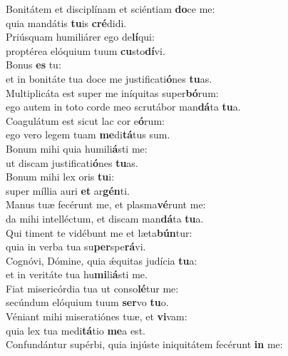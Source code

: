 \evenverse Bonitátem et disciplínam et sciéntiam \textbf{do}ce me:~\*\\
\evenverse quia mandátis \textbf{tu}is \textbf{cré}didi.\\
\oddverse Priúsquam humiliárer ego de\textbf{lí}qui:~\*\\
\oddverse proptérea elóquium tuum \textbf{cu}sto\textbf{dí}vi.\\
\evenverse Bonus \textbf{es} tu:~\*\\
\evenverse et in bonitáte tua doce me justificati\textbf{ó}nes \textbf{tu}as.\\
\oddverse Multiplicáta est super me iníquitas super\textbf{bó}rum:~\*\\
\oddverse ego autem in toto corde meo scrutábor man\textbf{dá}ta \textbf{tu}a.\\
\evenverse Coagulátum est sicut lac cor e\textbf{ó}rum:~\*\\
\evenverse ego vero legem tuam \textbf{me}di\textbf{tá}tus sum.\\
\oddverse Bonum mihi quia humili\textbf{á}sti me:~\*\\
\oddverse ut discam justificati\textbf{ó}nes \textbf{tu}as.\\
\evenverse Bonum mihi lex oris \textbf{tu}i:~\*\\
\evenverse super míllia auri \textbf{et} ar\textbf{gén}ti.\\
\oddverse Manus tuæ fecérunt me, et plasma\textbf{vé}runt me:~\*\\
\oddverse da mihi intelléctum, et discam man\textbf{dá}ta \textbf{tu}a.\\
\evenverse Qui timent te vidébunt me et læta\textbf{bún}tur:~\*\\
\evenverse quia in verba tua su\textbf{per}spe\textbf{rá}vi.\\
\oddverse Cognóvi, Dómine, quia ǽquitas judícia \textbf{tu}a:~\*\\
\oddverse et in veritáte tua hu\textbf{mi}li\textbf{á}sti me.\\
\evenverse Fiat misericórdia tua ut conso\textbf{lé}tur me:~\*\\
\evenverse secúndum elóquium tuum \textbf{ser}vo \textbf{tu}o.\\
\oddverse Véniant mihi miseratiónes tuæ, et \textbf{vi}vam:~\*\\
\oddverse quia lex tua medi\textbf{tá}tio \textbf{me}a est.\\
\evenverse Confundántur supérbi, quia injúste iniquitátem fecérunt \textbf{in} me:~\*\\
